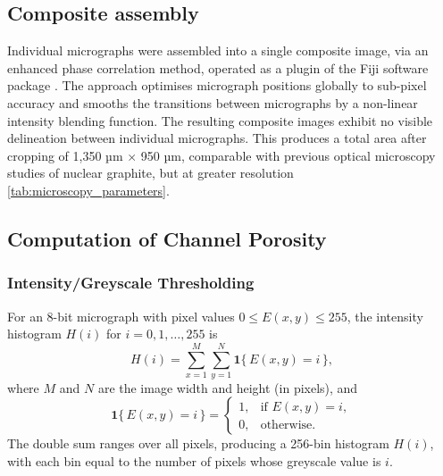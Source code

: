 \documentclass[review]{elsarticle}
\begin{document}
\subsection{Composite assembly}

Individual micrographs were assembled into a single composite image, via an
enhanced phase correlation method, operated as a plugin of the Fiji software
package \citep{schindelin2012fiji, Preibisch2009}. The approach optimises
micrograph positions globally to sub-pixel accuracy and smooths the transitions
between micrographs by a non-linear intensity blending function.  The resulting
composite images exhibit no visible delineation between individual micrographs.
This produces a total area after cropping of 1,350 µm $\times$ 950 µm, comparable
with previous optical microscopy studies of nuclear graphite, but at greater resolution \ref{tab:microscopy_parameters}.

\subsection{Computation of Channel Porosity}

\subsubsection{Intensity/Greyscale Thresholding}

For an 8-bit micrograph with pixel values \(0 \le E(x,y) \le 255\), the
intensity histogram \(H(i)\) for \(i=0,1,\dots,255\) is \begin{equation}\tag{i}
H(i) = \sum_{x=1}^{M}\sum_{y=1}^{N} \mathbf{1}\{\,E(x,y)=i\,\}, \end{equation}
where \(M\) and \(N\) are the image width and height (in pixels), and
\begin{equation}\tag{ii} \mathbf{1}\{\,E(x,y)=i\,\} = \begin{cases} 1, &
\text{if } E(x,y)=i,\\ 0, & \text{otherwise.} \end{cases} \end{equation} The
double sum ranges over all pixels, producing a 256-bin histogram \(H(i)\), with
each bin equal to the number of pixels whose greyscale value is \(i\).
\end{document}
